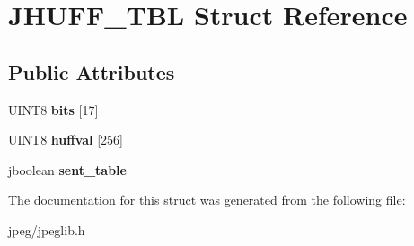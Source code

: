 \hypertarget{struct_j_h_u_f_f___t_b_l}{}\section{J\+H\+U\+F\+F\+\_\+\+T\+BL Struct Reference}
\label{struct_j_h_u_f_f___t_b_l}
\subsection*{Public Attributes}
\begin{DoxyCompactItemize}
\item 
U\+I\+N\+T8 {\bfseries bits} \mbox{[}17\mbox{]}\hypertarget{struct_j_h_u_f_f___t_b_l_a68b0ec25d6d06c13e0a4f74fbb683b3f}{}\label{struct_j_h_u_f_f___t_b_l_a68b0ec25d6d06c13e0a4f74fbb683b3f}

\item 
U\+I\+N\+T8 {\bfseries huffval} \mbox{[}256\mbox{]}\hypertarget{struct_j_h_u_f_f___t_b_l_a7aad276f6ced97323bb94ba5e6220961}{}\label{struct_j_h_u_f_f___t_b_l_a7aad276f6ced97323bb94ba5e6220961}

\item 
jboolean {\bfseries sent\+\_\+table}\hypertarget{struct_j_h_u_f_f___t_b_l_a24d2efddeb7d6df0c48551a568dd51d8}{}\label{struct_j_h_u_f_f___t_b_l_a24d2efddeb7d6df0c48551a568dd51d8}

\end{DoxyCompactItemize}


The documentation for this struct was generated from the following file\+:\begin{DoxyCompactItemize}
\item 
jpeg/jpeglib.\+h\end{DoxyCompactItemize}
